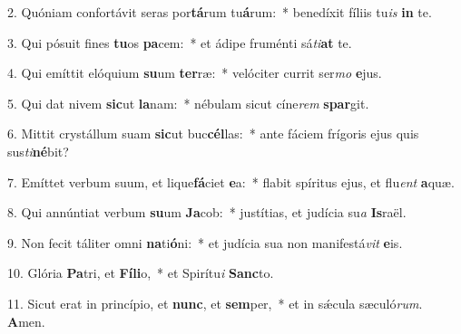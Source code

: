 2. Quóniam confortávit seras por\textbf{tá}rum tu\textbf{á}rum:~*  benedíxit fíliis tu\textit{is} \textbf{in} te.\

3. Qui pósuit fines \textbf{tu}os \textbf{pa}cem:~*  et ádipe fruménti sá\textit{ti}\textbf{at} te.\

4. Qui emíttit elóquium \textbf{su}um \textbf{ter}ræ:~*  velóciter currit ser\textit{mo} \textbf{e}jus.\

5. Qui dat nivem \textbf{sic}ut \textbf{la}nam:~*  nébulam sicut cíne\textit{rem} \textbf{spar}git.\

6. Mittit crystállum suam \textbf{sic}ut buc\textbf{cél}las:~*  ante fáciem frígoris ejus quis sus\textit{ti}\textbf{né}bit?\

7. Emíttet verbum suum, et lique\textbf{fá}ciet \textbf{e}a:~*  flabit spíritus ejus, et flu\textit{ent} \textbf{a}quæ.\

8. Qui annúntiat verbum \textbf{su}um \textbf{Ja}cob:~*  justítias, et judícia su\textit{a} \textbf{Is}raël.\

9. Non fecit táliter omni \textbf{na}ti\textbf{ó}ni:~*  et judícia sua non manifestá\textit{vit} \textbf{e}is.\

10. Glória \textbf{Pa}tri, et \textbf{Fí}\textbf{li}o,~*  et Spirítu\textit{i} \textbf{Sanc}to.\

11. Sicut erat in princípio, et \textbf{nunc}, et \textbf{sem}per,~*  et in sǽcula sæculó\textit{rum}. \textbf{A}men.\

